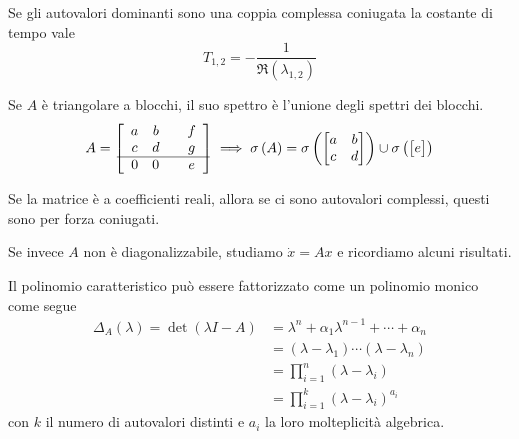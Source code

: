 Se gli autovalori dominanti sono una coppia complessa coniugata la costante di tempo vale
\begin{equation*}
	\boxed{T_{1,2} =-\frac{1}{\Re\left(\lambda _{1,2}\right)}}
\end{equation*}
\begin{rem}
	Se $A$ è triangolare a blocchi, il suo spettro è l'unione degli spettri dei blocchi.
	\begin{equation*}
		A=\begin{bmatrix}
		\begin{array}{ c c }
			a & b \\
			c & d 
		\end{array} & \begin{array}{ c }
		f\\
		g
		\end{array}\\
		\hline
		\begin{array}{ c c }
			0 & 0 
		\end{array} & e
		\end{bmatrix} \implies \sigma \left(A\right) =\sigma \left(\begin{bmatrix}
		a & b\\
		c & d
		\end{bmatrix}\right) \cup \sigma \left(\begin{bmatrix}
		e
		\end{bmatrix}\right)
	\end{equation*}
\end{rem}
\begin{rem}
	Se la matrice è a coefficienti reali, allora se ci sono autovalori complessi, questi sono per forza coniugati.
\end{rem}
Se invece $A$ non è diagonalizzabile, studiamo $\dot{x} =Ax$ e ricordiamo alcuni risultati.
\begin{rem}
	Il polinomio caratteristico può essere fattorizzato come un polinomio monico come segue\begin{equation*}
	\begin{aligned}
		\Delta _A\left(\lambda \right) =\det\left(\lambda I-A\right) & =\lambda ^n +\alpha _1 \lambda ^{n-1} +\cdots +\alpha _n                    \\
		                                                                       & =\left(\lambda -\lambda _1\right) \cdots \left(\lambda -\lambda _n\right) \\
		                                                                       & =\prod^n_{i=1}\left(\lambda -\lambda _i\right)                   \\
		                                                                       & =\prod^k_{i=1}\left(\lambda -\lambda _i\right)^{a_i}             
	\end{aligned}
	\end{equation*}
	con $k$ il numero di autovalori distinti e $a_i$ la loro molteplicità algebrica.
\end{rem}
